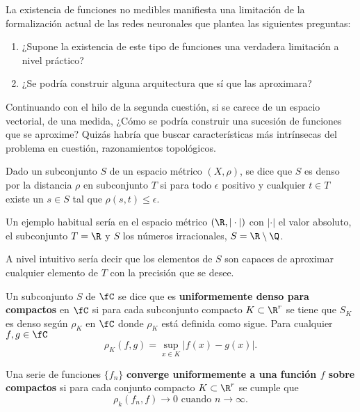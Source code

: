 La existencia de funciones no medibles manifiesta una limitación
de la formalización actual de las redes neuronales que plantea las siguientes 
preguntas: 
\begin{enumerate}
    \item ¿Supone la existencia de este tipo de funciones una verdadera limitación a nivel práctico?
    \item ¿Se podría construir alguna arquitectura que sí que las aproximara?
\end{enumerate}  

Continuando con el hilo de la segunda cuestión, si se carece de un espacio vectorial, 
de una medida,  ¿Cómo se podría construir una sucesión de funciones que se aproxime?
Quizás habría que buscar características más intrínsecas del problema en cuestión, 
razonamientos topológicos.

\begin{definicion}  
    Dado un subconjunto $S$ de un espacio métrico $(X, \rho)$, se dice que $S$ es denso por la distancia $\rho$
    en subconjunto $T$ si para todo $\epsilon$ positivo y cualquier $t \in T$ existe un $s \in S$ tal 
    que $\rho(s,t) \leq \epsilon$. 
\end{definicion}

Un ejemplo habitual sería en el espacio métrico $(\R, |\cdot|)$ con $|\cdot|$ el valor absoluto, el subconjunto 
$T = \R$ y $S$ los números irracionales, $S = \R \setminus \Q$. 

A nivel intuitivo sería decir que los elementos de $S$ son capaces de aproximar cualquier elemento de $T$
con la precisión que se desee. 

\begin{definicion} 
    Un subconjunto $S$ de $\fC$ se dice que es \textbf{uniformemente denso para compactos} en  $\fC$
    si para cada subconjunto compacto $K \subset \R^r$ se tiene que $S_K$ es denso según $\rho_K$ en $\fC$
    donde $\rho_K$ está definida como sigue.
    Para cualquier $f,g \in \fC$ 
    \begin{equation}
        \rho _ K (f,g) = \sup_{x \in K} |f(x) - g(x)|.
    \end{equation}
\end{definicion}

\begin{definicion}
    Una serie de funciones $\{f_n\}$ \textbf{converge uniformemente a una función $f$ sobre compactos} si para 
    cada  conjunto compacto $K \subset \R^r$  se cumple que
    \begin{equation}
        \rho_k (f_n, f) \longrightarrow 0 \text{ cuando } n \longrightarrow \infty.
    \end{equation} 
\end{definicion}


